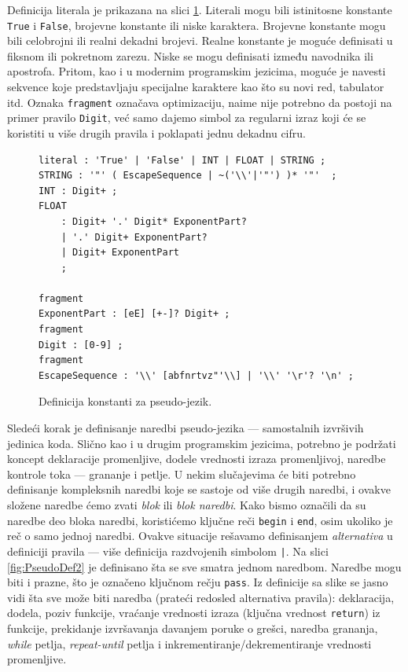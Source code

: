 Definicija literala je prikazana na slici \ref{fig:PseudoDef7}. Literali mogu bili istinitosne konstante \texttt{True} i \texttt{False}, brojevne konstante ili niske karaktera. Brojevne konstante mogu bili celobrojni ili realni dekadni brojevi. Realne konstante je moguće definisati u fiksnom ili pokretnom zarezu. Niske se mogu definisati između navodnika ili apostrofa. Pritom, kao i u modernim programskim jezicima, moguće je navesti sekvence koje predstavljaju specijalne karaktere kao što su novi red, tabulator itd. Oznaka \texttt{fragment} označava optimizaciju, naime nije potrebno da postoji na primer pravilo \texttt{Digit}, već samo dajemo simbol za regularni izraz koji će se koristiti u više drugih pravila i poklapati jednu dekadnu cifru.

\begin{figure}[h!]
\begin{lstlisting}[language={}]
literal : 'True' | 'False' | INT | FLOAT | STRING ;
STRING : '"' ( EscapeSequence | ~('\\'|'"') )* '"'  ;
INT : Digit+ ;
FLOAT
    : Digit+ '.' Digit* ExponentPart?
    | '.' Digit+ ExponentPart?
    | Digit+ ExponentPart
    ;

fragment
ExponentPart : [eE] [+-]? Digit+ ;
fragment
Digit : [0-9] ;
fragment
EscapeSequence : '\\' [abfnrtvz"'\\] | '\\' '\r'? '\n' ;
\end{lstlisting}
\caption{Definicija konstanti za pseudo-jezik.}
\label{fig:PseudoDef7}
\end{figure}

Sledeći korak je definisanje naredbi pseudo-jezika --- samostalnih izvršivih jedinica koda. Slično kao i u drugim programskim jezicima, potrebno je podržati koncept deklaracije promenljive, dodele vrednosti izraza promenljivoj, naredbe kontrole toka --- grananje i petlje. U nekim slučajevima će biti potrebno definisanje kompleksnih naredbi koje se sastoje od više drugih naredbi, i ovakve složene naredbe ćemo zvati \emph{blok} ili \emph{blok naredbi}. Kako bismo označili da su naredbe deo bloka naredbi, koristićemo ključne reči \texttt{begin} i \texttt{end}, osim ukoliko je reč o samo jednoj naredbi. Ovakve situacije rešavamo definisanjem \emph{alternativa} u definiciji pravila --- više definicija razdvojenih simbolom \texttt{|}. Na slici \ref{fig:PseudoDef2} je definisano šta se sve smatra jednom naredbom. Naredbe mogu biti i prazne, što je označeno ključnom rečju \texttt{pass}. Iz definicije sa slike se jasno vidi šta sve može biti naredba (prateći redosled alternativa pravila): deklaracija, dodela, poziv funkcije, vraćanje vrednosti izraza (ključna vrednost \texttt{return}) iz funkcije, prekidanje izvršavanja davanjem poruke o grešci, naredba grananja, \emph{while} petlja, \emph{repeat-until} petlja i inkrementiranje/dekrementiranje vrednosti promenljive.
    
